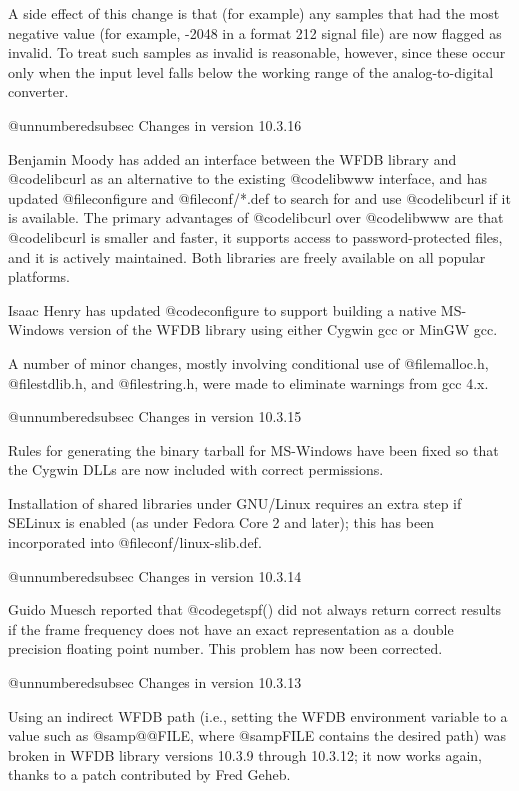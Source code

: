 A side effect of this change is that (for example) any samples that had the
most negative value (for example, -2048 in a format 212 signal file) are now
flagged as invalid.  To treat such samples as invalid is reasonable, however,
since these occur only when the input level falls below the working range of
the analog-to-digital converter.

@unnumberedsubsec Changes in version 10.3.16

Benjamin Moody has added an interface between the WFDB library and
@code{libcurl} as an alternative to the existing @code{libwww} interface, and
has updated @file{configure} and @file{conf/*.def} to search for and use
@code{libcurl} if it is available.  The primary advantages of @code{libcurl}
over @code{libwww} are that @code{libcurl} is smaller and faster, it supports
access to password-protected files, and it is actively maintained.  Both
libraries are freely available on all popular platforms.

Isaac Henry has updated @code{configure} to support building a native
MS-Windows version of the WFDB library using either Cygwin gcc or MinGW
gcc.

A number of minor changes, mostly involving conditional use of
@file{malloc.h}, @file{stdlib.h}, and @file{string.h}, were made to
eliminate warnings from gcc 4.x.

@unnumberedsubsec Changes in version 10.3.15

Rules for generating the binary tarball for MS-Windows have been
fixed so that the Cygwin DLLs are now included with correct
permissions.

Installation of shared libraries under GNU/Linux requires an extra
step if SELinux is enabled (as under Fedora Core 2 and later);  this
has been incorporated into @file{conf/linux-slib.def}.

@unnumberedsubsec Changes in version 10.3.14

Guido Muesch reported that @code{getspf()} did not always
return correct results if the frame frequency does not have an exact
representation as a double precision floating point number.  This problem has
now been corrected.

@unnumberedsubsec Changes in version 10.3.13

Using an indirect WFDB path (i.e., setting the WFDB environment
variable to a value such as @samp{@@FILE}, where @samp{FILE} contains the
desired path) was broken in WFDB library versions 10.3.9 through
10.3.12;  it now works again, thanks to a patch contributed by
Fred Geheb.

